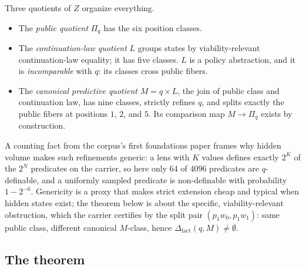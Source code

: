 \documentclass[11pt]{article}
\newcommand{\Dfact}{\Delta_{\mathrm{fact}}}
\theoremstyle{definition}
\begin{document}
Three quotients of $Z$ organize everything.
\begin{itemize}
\item The \emph{public quotient} $\Pi_q$ has the six position classes.
\item The \emph{continuation-law quotient} $L$ groups states by
viability-relevant continuation-law equality; it has five classes. $L$ is a
policy abstraction, and it is \emph{incomparable} with $q$: its classes cross
public fibers.
\item The \emph{canonical predictive quotient} $M = q \times L$, the join of
public class and continuation law, has nine classes, strictly refines $q$, and
splits exactly the public fibers at positions $1$, $2$, and $5$. Its
comparison map $M \to \Pi_q$ exists by construction.
\end{itemize}

A counting fact from the corpus's first foundations paper frames why hidden
volume makes such refinements generic: a lens with $K$ values defines exactly
$2^K$ of the $2^N$ predicates on the carrier, so here only $64$ of $4096$
predicates are $q$-definable, and a uniformly sampled predicate is
non-definable with probability $1 - 2^{-6}$. Genericity is a proxy that makes
strict extension cheap and typical when hidden states exist; the theorem below
is about the specific, viability-relevant obstruction, which the carrier
certifies by the split pair $(p_1 w_0, p_1 w_1)$: same public class, different
canonical $M$-class, hence $\Dfact(q, M) \neq \emptyset$.

\subsection{The theorem}
\end{document}
